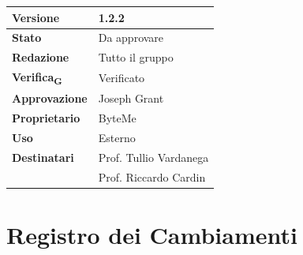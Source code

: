 \documentclass[11pt,a4paper]{article}
\newcommand{\gls}[1]{#1\textsubscript{G}}
\begin{document}
\begin{titlepage}
    \begin{table}[H]
        \centering
        \begin{tabular}{|l|p{5cm}|}
            \hline
            \textbf{Versione} & 1.2.2 \\
            \hline
            \textbf{Stato} & Da approvare \\
            \hline
            \textbf{Redazione} & Tutto il gruppo \\
            \hline
            \textbf{\gls{Verifica}} & Verificato \\
            \hline
            \textbf{Approvazione} & Joseph Grant \\
            \hline
            \textbf{Proprietario} & ByteMe \\
            \hline
            \textbf{Uso} & Esterno \\
            \hline
            \textbf{Destinatari} & Prof. Tullio Vardanega \\ & Prof. Riccardo Cardin \\
            \hline
        \end{tabular}
    \end{table}
    
    \vfill
\end{titlepage}

\thispagestyle{empty}
\section*{Registro dei Cambiamenti}
\end{document}

